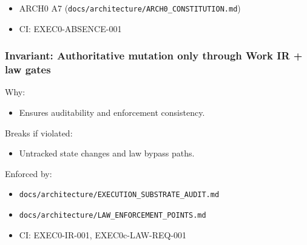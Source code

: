 \documentclass[9pt,a4paper,openany]{book}
\begin{document}
\begin{itemize}
\item ARCH0 A7 (\texttt{docs/\allowbreak{}architecture/\allowbreak{}ARCH0\_\allowbreak{}CONSTITUTION.\allowbreak{}md})
\end{itemize}


\begin{itemize}
\item CI: EXEC0-\allowbreak{}ABSENCE-\allowbreak{}001
\end{itemize}





\subsubsection{Invariant: Authoritative mutation only through Work IR + law gates}


Why:



\begin{itemize}
\item Ensures auditability and enforcement consistency.\allowbreak{}
\end{itemize}


Breaks if violated:



\begin{itemize}
\item Untracked state changes and law bypass paths.\allowbreak{}
\end{itemize}


Enforced by:



\begin{itemize}
\item \texttt{docs/\allowbreak{}architecture/\allowbreak{}EXECUTION\_\allowbreak{}SUBSTRATE\_\allowbreak{}AUDIT.\allowbreak{}md}
\end{itemize}


\begin{itemize}
\item \texttt{docs/\allowbreak{}architecture/\allowbreak{}LAW\_\allowbreak{}ENFORCEMENT\_\allowbreak{}POINTS.\allowbreak{}md}
\end{itemize}


\begin{itemize}
\item CI: EXEC0-\allowbreak{}IR-\allowbreak{}001, EXEC0c-\allowbreak{}LAW-\allowbreak{}REQ-\allowbreak{}001
\end{itemize}
\end{document}
